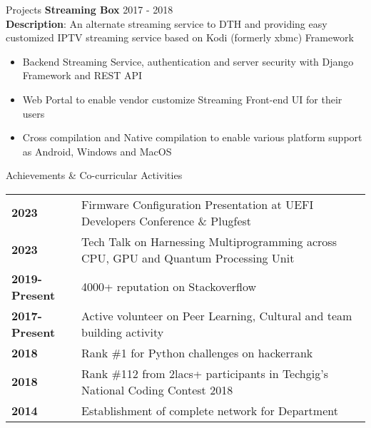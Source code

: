 \documentclass{resume} %
\begin{document}
\begin{rSection}{Projects}
\textbf{Streaming Box} \hfill {2017 - 2018}\\
\textbf{Description}: An alternate streaming service to DTH and providing easy customized IPTV streaming service based on Kodi (formerly xbmc) Framework

\begin{itemize}
    \item Backend Streaming Service, authentication and server security with Django Framework and REST API
    \item Web Portal to enable vendor customize Streaming Front-end UI for their users
    \item Cross compilation and Native compilation to enable various platform support as Android, Windows and MacOS
\end{itemize}

\end{rSection}



\begin{rSection}{Achievements \& Co-curricular Activities}

\begin{tabular}{ @{} >{\bfseries}l @{\hspace{6ex}} l }
2023 & Firmware Configuration Presentation at UEFI Developers Conference \& Plugfest \\
2023 & Tech Talk on Harnessing Multiprogramming across CPU, GPU and Quantum Processing Unit \\
2019-Present & 4000+ reputation on Stackoverflow \\
2017-Present & Active volunteer on Peer Learning, Cultural and team building activity \\
2018 & Rank \#1 for Python challenges on hackerrank \\
2018 & Rank \#112 from 2lacs+ participants in Techgig's National Coding Contest 2018 \\
2014 & Establishment of complete network for Department

\end{tabular}

\end{rSection}
\end{document}
